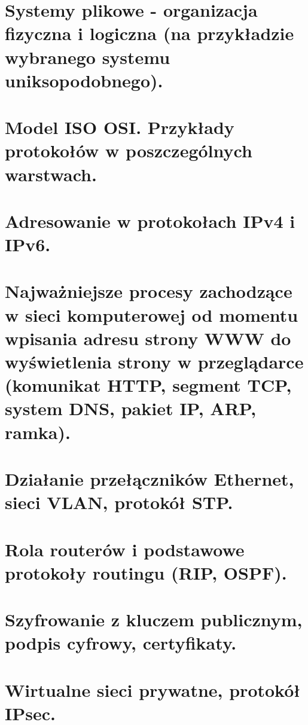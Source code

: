 \documentclass[12pt]{article}
\begin{document}
    \section{Systemy plikowe - organizacja fizyczna i logiczna (na przykładzie wybranego systemu uniksopodobnego).}
    \section{Model ISO OSI. Przykłady protokołów w poszczególnych warstwach.}
    \section{Adresowanie w protokołach IPv4 i IPv6.}
    \section{Najważniejsze procesy zachodzące w sieci komputerowej od momentu wpisania adresu strony WWW do wyświetlenia strony w przeglądarce (komunikat HTTP, segment TCP, system DNS, pakiet IP, ARP, ramka).}
    \section{Działanie przełączników Ethernet, sieci VLAN, protokół STP.}
    \section{Rola routerów i podstawowe protokoły routingu (RIP, OSPF).}
    \section{Szyfrowanie z kluczem publicznym, podpis cyfrowy, certyfikaty.}
    \section{Wirtualne sieci prywatne, protokół IPsec.}
\end{document}
